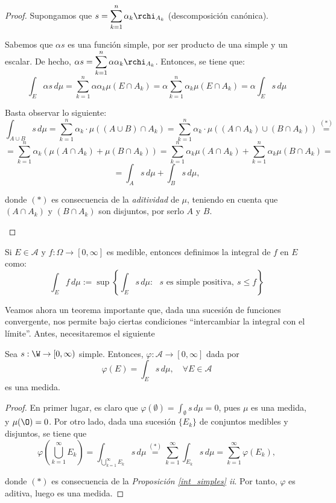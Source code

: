 \begin{proof} Supongamos que $\displaystyle s = \sum_{k=1}^n \alpha_k\rchi_{A_k}$ (descomposición canónica).\hfill
    \begin{nlist}
	\item Sabemos que $\alpha s$ es una función simple, por ser producto de una simple y un escalar. De hecho, $\displaystyle \alpha s = \sum_{k=1}^n \alpha \alpha_k \rchi_{A_k}$. Entonces, se tiene que: $$\int_E \alpha s\, d\mu = \sum_{k=1}^n \alpha \alpha_k \mu (E\cap A_k) = \alpha \sum_{k=1}^n \alpha_k \mu (E\cap A_k) = \alpha \int_E s\, d\mu$$
	\item Basta observar lo siguiente: $$\int_{A\cup B} s\, d\mu = \sum_{k=1}^n \alpha_k\cdot \mu((A\cup B)\cap A_k) = \sum_{k=1}^n \alpha_k \cdot \mu((A\cap A_k)\cup (B \cap A_k)) \overset{(*)}{=}$$ $$=\sum_{k=1}^n \alpha_k \left( \mu(A\cap A_k) +  \mu(B \cap A_k)\right) = \sum_{k=1}^n \alpha_k \mu(A\cap A_k) + \sum_{k=1}^n \alpha_k \mu(B\cap A_k) =$$ $$= \int_A s\, d\mu + \int_B s\, d\mu,$$

	donde $(*)$ es consecuencia de la \textit{aditividad} de $\mu$, teniendo en cuenta que $(A\cap A_k)$ y $(B\cap A_k)$ son disjuntos, por serlo $A$ y $B$.
\end{nlist}
\end{proof}

\begin{ndef}
  Si $E\in \mathscr A$ y $f: \Omega \to [0,\infty]$ es medible, entonces definimos la integral de $f$ en $E$ como:
  \[
    \int_E f\, d\mu := \sup\left\{\int_E s\, d\mu: \text{ $s$ es simple positiva}, \ s \leq f\right\}
  \]

\end{ndef}

Veamos ahora un teorema importante que, dada una sucesión de funciones convergente, nos permite bajo ciertas condiciones ``intercambiar la integral con el límite''. Antes, necesitaremos el siguiente


\begin{lema} \label{phi}
	Sea $s:\W \to [0,\infty)$ simple. Entonces, $\varphi:\mathscr A \to [0,\infty]$ dada por $$\varphi(E) = \int_E s\, d\mu, \quad \forall E \in \mathscr A$$ es una medida.
\end{lema}

	\begin{proof} En primer lugar, es claro que $\displaystyle \varphi(\emptyset) = \int_\emptyset s\, d\mu = 0$, pues $\mu$ es una medida, y $\mu(\O) = 0$. Por otro lado, dada una sucesión $\{E_k\}$ de conjuntos medibles y disjuntos, se tiene que $$\varphi \left(\bigcup_{k=1}^\infty E_k \right) = \int_{\bigcup_{k=1}^\infty E_k} s\, d\mu \overset{(*)}{=} \sum_{k=1}^\infty \int_{E_k} s\, d\mu = \sum_{k=1}^\infty \varphi(E_k),$$

	donde $(*)$ es consecuencia de la \textit{Proposición \ref{int_simples} ii}. Por tanto, $\varphi$ es aditiva, luego es una medida.
\end{proof}

